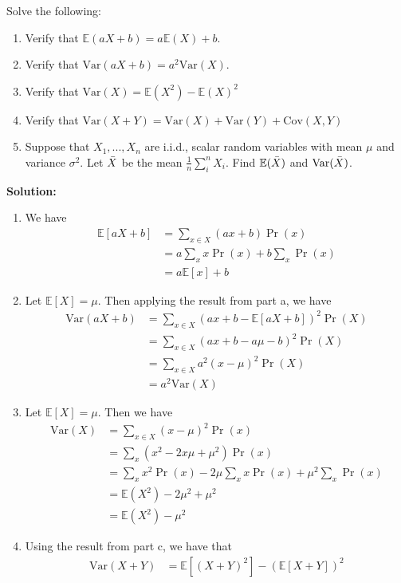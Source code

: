 \documentclass{harvardml}
\theoremstyle{definition}
\theoremstyle{plain}
\newcommand{\E}{\mathbb{E}}
\newcommand{\var}{\text{Var}}
\newcommand{\cov}{\text{Cov}}
\begin{document}
\begin{problem} Solve the following: 
\begin{enumerate} [label=(\alph*)] 
\item Verify that $\E(aX + b) = a \E(X) + b$.
\item Verify that $\var(aX + b) = a^2\var(X)$.
\item Verify that $\var(X) = \E(X^2) - \E(X)^2$
\item Verify that $\var(X + Y) = \var(X) + \var(Y) + \cov(X, Y)$

\item Suppose that $X_1, ..., X_n$ are i.i.d., scalar random variables with mean $\mu$ and variance $\sigma^2$. Let $\Bar{X}$ be the mean $\frac{1}{n}\sum_i^n X_i$. Find $\E(\Bar{X})$ and $\var(\Bar{X})$.
\end{enumerate}
\textbf{Solution:} 
\begin{enumerate} [label=(\alph*)] 
\item We have 
\begin{align*}
	\E[aX + b] &= \sum_{x \in X} \left(ax + b\right) \Pr (x) \\
	&= a \sum_{x} x \Pr(x) + b\sum_x \Pr(x) \\
	&= a \E[x] + b
\end{align*}
\item Let $\E[X] = \mu$. Then applying the result from part a, we have
\begin{align*}
	\var(aX + b) &= \sum_{x \in X} \left( ax + b - \E[a X + b] \right)^2 \Pr (X) \\
	&= \sum_{x \in X}  \left( ax + b - a\mu - b \right)^2 \Pr (X) \\
	&= \sum_{x \in X}  a^2 (x-\mu)^2 \Pr (X) \\
	&= a^2 \var(X)
\end{align*}
\item Let $\E[X] = \mu$. Then we have 
\begin{align*}
	\var(X) &= \sum_{x \in X} (x - \mu)^2 \Pr (x) \\
	&= \sum_x \left( x^2 - 2x\mu + \mu^2 \right) \Pr(x) \\
	&= \sum_x x^2 \Pr(x) - 2\mu\sum_x x \Pr(x) + \mu^2 \sum_x \Pr(x)\\
	&= \E(X^2) - 2\mu^2 + \mu^2 \\
	&= \E(X^2) - \mu^2
\end{align*}
\newpage
\item Using the result from part c, we have that
\begin{align*}
	\var(X+Y) &= \E[(X+Y)^2] - (\E[X+Y])^2 \\

\end{align*}
\end{enumerate}
\end{problem}
\end{document}
